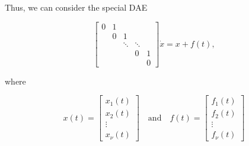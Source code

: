 \documentclass[]{book}
\theoremstyle{definition}
\theoremstyle{definition}
\theoremstyle{definition}
\theoremstyle{definition}
\theoremstyle{remark}
\begin{document}
Thus, we can consider the special DAE

\begin{equation}
\begin{bmatrix}
0 & 1 &        &         &    \\
  & 0 & 1      &         &    \\
  &   & \ddots & \ddots  &    \\
  &   &        & 0       & 1  \\
  &   &        &         & 0 
\end{bmatrix}
\dot x = x + f(t),
\label{eq:spec-dae-rkm-cc}
\end{equation}

where

\[
 x(t) = \begin{bmatrix} x_1(t) \\ x_2(t) \\ \vdots \\ x_\nu(t) \end{bmatrix}
 \quad\text{and}\quad
 f(t) = \begin{bmatrix} f_1(t) \\ f_2(t) \\ \vdots \\ f_\nu(t) \end{bmatrix}
 \]
\end{document}
